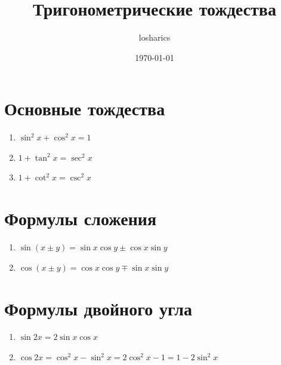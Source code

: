 \documentclass[12pt]{article}
\title{Тригонометрические тождества}
\author{losharics}
\date{\today}
\begin{document}
\maketitle

\section*{Основные тождества}

\begin{enumerate}
    \item $\sin^2 x + \cos^2 x = 1$
    \item $1 + \tan^2 x = \sec^2 x$
    \item $1 + \cot^2 x = \csc^2 x$
\end{enumerate}

\section*{Формулы сложения}

\begin{enumerate}
    \item $\sin(x \pm y) = \sin x \cos y \pm \cos x \sin y$
    \item $\cos(x \pm y) = \cos x \cos y \mp \sin x \sin y$
\end{enumerate}

\section*{Формулы двойного угла}

\begin{enumerate}
    \item $\sin 2x = 2 \sin x \cos x$
    \item $\cos 2x = \cos^2 x - \sin^2 x = 2 \cos^2 x - 1 = 1 - 2 \sin^2 x$
\end{enumerate}
\end{document}
